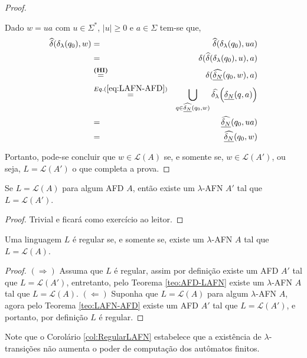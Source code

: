 \begin{proof}
\begin{itemize}
		Dado $w = ua$ com $u \in \Sigma^*$, $|u| \geq 0$ e $a \in \Sigma$ tem-se que, 
		\begin{eqnarray*}
			\widehat{\delta}(\delta_\lambda(q_0), w) & = & \widehat{\delta}(\delta_\lambda(q_0), ua)\\
			& = & \delta(\widehat{\delta}(\delta_\lambda(q_0), u), a)\\
			& \stackrel{\textbf{(HI)}}{=} & \delta(\widehat{\underline{\delta_N}}(q_0, w), a)\\
			& \stackrel{Eq. (\ref{eq:LAFN-AFD})}{=} & \bigcup_{q \in \widehat{\underline{\delta_N}}(q_0, w)} \widehat{\delta_\lambda}\Big(\underline{\delta_N}(q, a)\Big)\\
			& = & \widehat{\underline{\delta_N}}(q_0, ua)\\
			& = & \widehat{\underline{\delta_N}}(q_0, w)
		\end{eqnarray*}
	\end{itemize}
	Portanto, pode-se concluir que $w \in \mathcal{L}(A)$ se, e somente se, $w \in \mathcal{L}(A')$, ou seja, $L = \mathcal{L}(A')$ o que completa a prova.
\end{proof}

\begin{theorem}\label{teo:AFD-LAFN}
	Se $L = \mathcal{L}(A)$ para algum AFD $A$, então existe um $\lambda$-AFN $A'$ tal que $L = \mathcal{L}(A')$.
\end{theorem}

\begin{proof}
	Trivial e ficará como exercício ao leitor.
\end{proof}

\begin{corollary}\label{col:RegularLAFN}
	Uma linguagem $L$ é regular se, e somente se, existe um $\lambda$-AFN $A$ tal que $L = \mathcal{L}(A)$.
\end{corollary}

\begin{proof}
	$(\Rightarrow)$ Assuma que $L$ é regular, assim por definição existe um AFD $A'$ tal que $L = \mathcal{L}(A')$, entretanto, pelo Teorema \ref{teo:AFD-LAFN} existe um $\lambda$-AFN $A$ tal que $L = \mathcal{L}(A)$. $(\Leftarrow)$ Suponha que $L = \mathcal{L}(A)$ para algum $\lambda$-AFN $A$, agora pelo Teorema \ref{teo:LAFN-AFD} existe um AFD $A'$ tal que $L = \mathcal{L}(A')$, e portanto, por definição $L$ é regular.
\end{proof}

\begin{rema}
	Note que o Corolário \ref{col:RegularLAFN} estabelece que a existência de $\lambda$-transições não aumenta o poder de computação dos autômatos finitos.
\end{rema}

